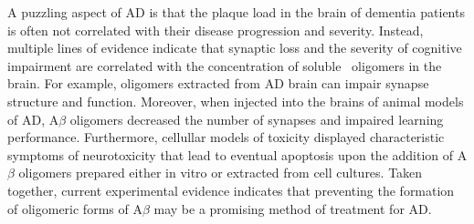 A puzzling aspect of AD is that the plaque load in the brain of dementia patients is often not correlated with their disease progression and severity. Instead, multiple lines of evidence indicate that synaptic loss and the severity of cognitive impairment are correlated with the concentration of soluble \abeta\ oligomers in the brain.\cite{Wang:1999fx,McLean:1999ud,Lue:1999vx} For example, oligomers extracted from AD brain can impair synapse structure and function.\cite{Shankar:2008bg}
 Moreover, when injected into the brains of animal models of AD, A$\beta$ oligomers decreased the number of synapses and impaired learning performance.\cite{Lesne:2006gx,Cleary:2005kt,Martins:2007bz,Tam:2012vz} Furthermore, cellullar models of toxicity displayed characteristic symptoms of neurotoxicity that lead to eventual apoptosis upon the addition of A$\beta$ oligomers prepared either in vitro or extracted from cell cultures.\cite{Cappai:2007bc,Lambert:1998ve,Walsh:2002p2566,Shankar:2008bg,Walsh:2007fu} Taken together, current experimental evidence indicates that preventing the formation of oligomeric forms of A$\beta$ may be a promising method of treatment for AD.



